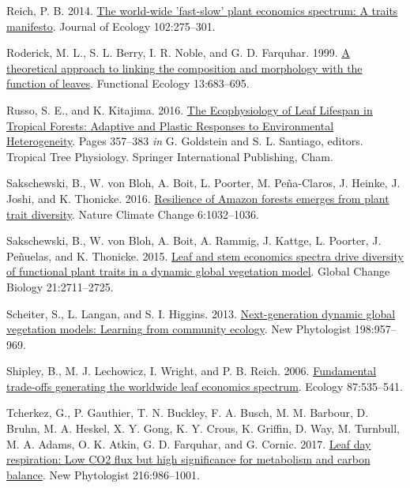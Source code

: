 \documentclass[
  12pt,
  a4paper,
,tablecaptionabove
]{scrartcl}
\newlength{\cslhangindent}
\newenvironment{CSLReferences}[2] %
 {%
  \setlength{\parindent}{0pt}
  \ifodd #1 \everypar{\setlength{\hangindent}{\cslhangindent}}\ignorespaces\fi
  \ifnum #2 > 0
  \setlength{\parskip}{#2\baselineskip}
  \fi
 }%
 {}
\begin{document}
\begin{CSLReferences}{1}{0}
\leavevmode{}%
Reich, P. B. 2014. \href{https://doi.org/10.1111/1365-2745.12211}{The
world-wide 'fast-slow' plant economics spectrum: {A} traits manifesto}.
Journal of Ecology 102:275--301.

\leavevmode{}%
Roderick, M. L., S. L. Berry, I. R. Noble, and G. D. Farquhar. 1999.
\href{https://doi.org/10.1046/j.1365-2435.1999.00368.x}{A theoretical
approach to linking the composition and morphology with the function of
leaves}. Functional Ecology 13:683--695.

\leavevmode{}%
Russo, S. E., and K. Kitajima. 2016.
\href{https://doi.org/10.1007/978-3-319-27422-5_17}{The {Ecophysiology}
of {Leaf Lifespan} in {Tropical Forests}: {Adaptive} and {Plastic
Responses} to {Environmental Heterogeneity}}. Pages 357--383 \emph{in}
G. Goldstein and S. L. Santiago, editors. Tropical {Tree Physiology}.
{Springer International Publishing}, {Cham}.

\leavevmode{}%
Sakschewski, B., W. von Bloh, A. Boit, L. Poorter, M. Peña-Claros, J.
Heinke, J. Joshi, and K. Thonicke. 2016.
\href{https://doi.org/10.1038/nclimate3109}{Resilience of {Amazon}
forests emerges from plant trait diversity}. Nature Climate Change
6:1032--1036.

\leavevmode{}%
Sakschewski, B., W. von Bloh, A. Boit, A. Rammig, J. Kattge, L. Poorter,
J. Peñuelas, and K. Thonicke. 2015.
\href{https://doi.org/10.1111/gcb.12870}{Leaf and stem economics spectra
drive diversity of functional plant traits in a dynamic global
vegetation model}. Global Change Biology 21:2711--2725.

\leavevmode{}%
Scheiter, S., L. Langan, and S. I. Higgins. 2013.
\href{https://doi.org/10.1111/nph.12210}{Next-generation dynamic global
vegetation models: {Learning} from community ecology}. New Phytologist
198:957--969.

\leavevmode{}%
Shipley, B., M. J. Lechowicz, I. Wright, and P. B. Reich. 2006.
\href{https://doi.org/10.1890/05-1051}{Fundamental trade-offs generating
the worldwide leaf economics spectrum}. Ecology 87:535--541.

\leavevmode{}%
Tcherkez, G., P. Gauthier, T. N. Buckley, F. A. Busch, M. M. Barbour, D.
Bruhn, M. A. Heskel, X. Y. Gong, K. Y. Crous, K. Griffin, D. Way, M.
Turnbull, M. A. Adams, O. K. Atkin, G. D. Farquhar, and G. Cornic. 2017.
\href{https://doi.org/10.1111/nph.14816}{Leaf day respiration: Low {CO2}
flux but high significance for metabolism and carbon balance}. New
Phytologist 216:986--1001.


\end{CSLReferences}
\end{document}
